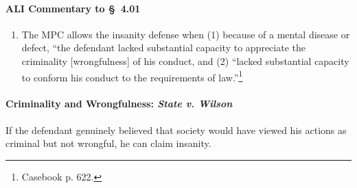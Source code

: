 \paragraph{ALI Commentary to \S\ 4.01}

\begin{enumerate}
    \item The MPC allows the insanity defense when (1) because of a mental 
    disease or defect, ``the defendant lacked substantial capacity to 
    appreciate the criminality [wrongfulness] of his conduct, and (2) ``lacked 
    substantial capacity to conform his conduct to the requirements of 
    law.''\footnote{Casebook p. 622.}
\end{enumerate}

\paragraph{Criminality and Wrongfulness: \emph{State v. Wilson}}

If the defendant genuinely believed that society would have viewed his actions 
as criminal but not wrongful, he can claim insanity.

